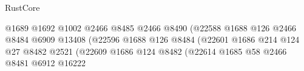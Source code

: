 \begin{lexlean}{RustCore}
\begin{coremodule}
                                                              @1689
                                                              @1692
                                                              @1002
                                                              @2466
                                                              @8485
                                                              @2466
                                                              @8490
                                                              (@22588
                                                                @1688
                                                                @126
                                                                @2466
                                                                @8484
                                                                @6909
                                                                @13408
                                                                (@22596
                                                                  @1688
                                                                  @126
                                                                  @8484
                                                                  (@22601
                                                                    @1686
                                                                    @214
                                                                    @124
                                                                    @27
                                                                    @8482
                                                                    @2521
                                                                    (@22609
                                                                      @1686
                                                                      @124
                                                                      @8482
                                                                      (@22614
                                                                        @1685
                                                                        @58
                                                                        @2466
                                                                        @8481
                                                                        @6912
                                                                        @16222

\end{coremodule}
\end{lexlean}
